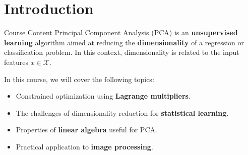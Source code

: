 \section[Introduction]{Introduction}

\begin{frame}{Course Content}
	Principal Component Analysis (PCA) is an \textbf{unsupervised learning} algorithm aimed at reducing the \textbf{dimensionality} of a regression or classification problem. In this context, dimensionality is related to the input features $x \in \mathcal{X}$.
	\vspace{0.5cm}
	
	In this course, we will cover the following topics:
	\begin{itemize}
		\pause
		\item Constrained optimization using \textbf{Lagrange multipliers}.
		\pause
		\item The challenges of dimensionality reduction for \textbf{statistical learning}.
		\pause
		\item Properties of \textbf{linear algebra} useful for PCA.
		\pause
		\item Practical application to \textbf{image processing}.
	\end{itemize}
\end{frame}